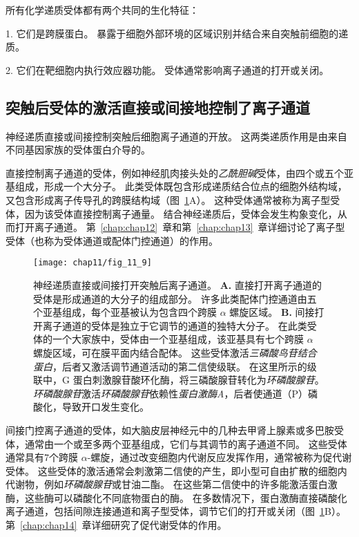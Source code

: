 所有化学递质受体都有两个共同的生化特征：

1. 它们是跨膜蛋白。
暴露于细胞外部环境的区域识别并结合来自突触前细胞的递质。


2. 它们在靶细胞内执行效应器功能。
受体通常影响离子通道的打开或关闭。



\subsection{突触后受体的激活直接或间接地控制了离子通道}

神经递质直接或间接控制突触后细胞离子通道的开放。
这两类递质作用是由来自不同基因家族的受体蛋白介导的。


直接控制离子通道的受体，例如神经肌肉接头处的\textit{乙酰胆碱}受体，由四个或五个亚基组成，形成一个大分子。
此类受体既包含形成递质结合位点的细胞外结构域，又包含形成离子传导孔的跨膜结构域（图~\ref{fig:11_9}A）。
这种受体通常被称为离子型受体，因为该受体直接控制离子通量。
结合神经递质后，受体会发生构象变化，从而打开离子通道。
第~\ref{chap:chap12}~章和第~\ref{chap:chap13}~章详细讨论了离子型受体（也称为受体通道或配体门控通道）的作用。


\begin{figure}[htbp]
	\centering
	\texttt{[image: chap11/fig\_11\_9]}
	\caption{神经递质直接或间接打开突触后离子通道。
		\textbf{A.} 直接打开离子通道的受体是形成通道的大分子的组成部分。 许多此类配体门控通道由五个亚基组成，每个亚基被认为包含四个跨膜 $\alpha$ 螺旋区域。
		\textbf{B.} 间接打开离子通道的受体是独立于它调节的通道的独特大分子。
		在此类受体的一个大家族中，受体由一个亚基组成，该亚基具有七个跨膜 $\alpha$ 螺旋区域，可在膜平面内结合配体。
		这些受体激活\textit{三磷酸鸟苷结合蛋白}，后者又激活调节通道活动的第二信使级联。
		在这里所示的级联中，G 蛋白刺激腺苷酸环化酶，将三磷酸腺苷转化为\textit{环磷酸腺苷}。
		\textit{环磷酸腺苷}激活\textit{环磷酸腺苷}依赖性\textit{蛋白激酶A}，后者使通道（P）磷酸化，导致开口发生变化。}
	\label{fig:11_9}
\end{figure}


间接门控离子通道的受体，如大脑皮层神经元中的几种去甲肾上腺素或多巴胺受体，通常由一个或至多两个亚基组成，它们与其调节的离子通道不同。
这些受体通常具有7个跨膜 $\alpha$-螺旋，通过改变细胞内代谢反应发挥作用，通常被称为促代谢受体。
这些受体的激活通常会刺激第二信使的产生，即小型可自由扩散的细胞内代谢物，例如\textit{环磷酸腺苷}或甘油二酯。
在这些第二信使中的许多能激活蛋白激酶，这些酶可以磷酸化不同底物蛋白的酶。
在多数情况下，蛋白激酶直接磷酸化离子通道，包括间隙连接通道和离子型受体，调节它们的打开或关闭（图~\ref{fig:11_9}B）。 
第~\ref{chap:chap14}~章详细研究了促代谢受体的作用。


